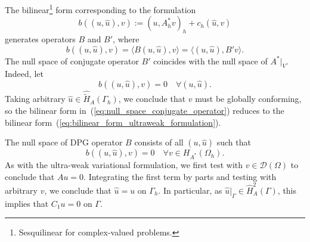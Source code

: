 The bilinear\footnote{Sesquilinear for complex-valued problems.} form corresponding to the formulation 
\[
b((u,\hat{u}),v) := (u,A^\ast_h v)_h  + c_h(\hat{u},v)
\]
generates operators $B$ and $B'$, where
\[
 b((u,\hat{u}),v) = \langle B(u,\hat{u}),v\rangle 
= \langle (u,\hat{u}),B'v\rangle.
\]
The null space of conjugate operator $B'$ coincides with the null space of $A^\ast\vert_V$. Indeed, let
\[
b((u,\hat{u}),v) = 0 \quad \forall (u,\hat{u}).
\label{eq:null_space_conjugate_operator}
\]
Taking arbitrary
$\hat{u} \in \hat{\tilde{H}}_A(\Gamma_h)$, we conclude that $v$ must be globally conforming, 
so the bilinear form in~(\ref{eq:null_space_conjugate_operator}) reduces to 
the bilinear form~(\ref{eq:bilinear_form_ultraweak_formulation}).

The null space of DPG operator $B$ consists of all $(u,\hat{u})$ such that
\[
 b((u,\hat{u}),v) = 0 \quad \forall v \in H_{A^\ast}(\Omega_h).
\]
As with the ultra-weak variational formulation, we first test with
$v \in \mathcal{D}(\Omega)$ to conclude that $A u = 0$. Integrating the first term by parts
and testing with arbitrary $v$, we conclude that $\hat{u} = u$ on $\Gamma_h$. In particular, as
$\hat{u}\vert_\Gamma \in \widehat{H}^2_A(\Gamma)$, this implies that $C_1 u = 0$ on $\Gamma$.



